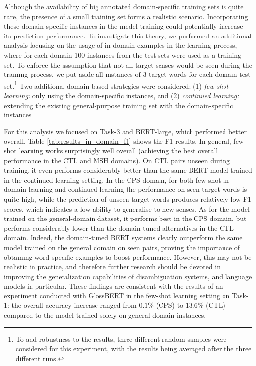 \documentclass[11pt,a4paper]{article}
\begin{document}
Although the availability of big annotated domain-specific training sets is quite rare, the presence of a small training set forms a realistic scenario.
Incorporating these domain-specific instances in the model training could potentially increase its prediction performance. To investigate this theory, we performed an additional analysis focusing on the usage of in-domain examples in the learning process, where for each domain 100 instances from the test sets were used as a training set. To enforce the assumption that not all target senses would be seen during the training process, we put aside all instances of 3 target words for each domain test set.\footnote{To add robustness to the results, three different random samples were considered for this experiment, with the results being averaged after the three different runs.}
Two additional domain-based strategies were considered: (1) \textit{few-shot learning:} only using the domain-specific instances, and (2) \textit{continued learning:} extending the existing general-purpose training set with the domain-specific instances. 

For this analysis we focused on Task-3 and BERT-large, which performed better overall. Table \ref{tab:results_in_domain_f1} shows the F1 results. In general, 
few-shot learning
works surprisingly well overall (achieving the best overall performance in the CTL and MSH domains). On CTL pairs unseen during training, it even performs considerably better  than the same BERT model trained in the continued learning setting.
In the CPS domain, for both few-shot in-domain learning and continued learning the performance on seen target words is quite high, while the prediction of unseen target words produces relatively low F1 scores, which indicates a low ability to generalise to new senses.
As for the model trained on the general-domain dataset, it performs best in the CPS domain, but performs considerably lower than the domain-tuned alternatives in the CTL domain. Indeed, the domain-tuned BERT systems clearly outperform the same model trained on the general domain on seen pairs, proving the importance of obtaining word-specific examples to boost performance. 
However, this may not be realistic in practice, and therefore further research should be devoted in improving the generalization capabilities of disambiguation systems, and language models in particular.
These findings are consistent with the results of an experiment conducted with GlossBERT in the few-shot learning setting on Task-1: the overall accuracy increase ranged from $0.1$\% (CPS) to $13.6$\% (CTL) compared to the model trained solely on general domain instances.
\end{document}
